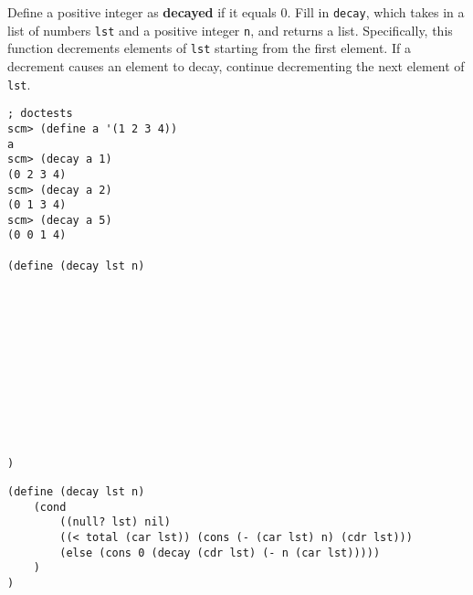 \begin{blocksection}
\question
Define a positive integer as \textbf{decayed} if it equals 0. Fill in \lstinline{decay}, which takes in a list of numbers \lstinline{lst} and a positive integer \lstinline{n}, and returns a list. Specifically, this function decrements elements of \lstinline{lst} starting from the first element. If a decrement causes an element to decay, continue decrementing the next element of \lstinline{lst}.

\begin{lstlisting}
; doctests
scm> (define a '(1 2 3 4))
a
scm> (decay a 1)
(0 2 3 4)
scm> (decay a 2)
(0 1 3 4)
scm> (decay a 5)
(0 0 1 4)

(define (decay lst n)












)
\end{lstlisting}
\end{blocksection}

\begin{blocksection}
\begin{solution}
\begin{lstlisting}
(define (decay lst n)
    (cond 
        ((null? lst) nil)
        ((< total (car lst)) (cons (- (car lst) n) (cdr lst)))
        (else (cons 0 (decay (cdr lst) (- n (car lst)))))
    )
)
\end{lstlisting}
\end{solution}
\end{blocksection}